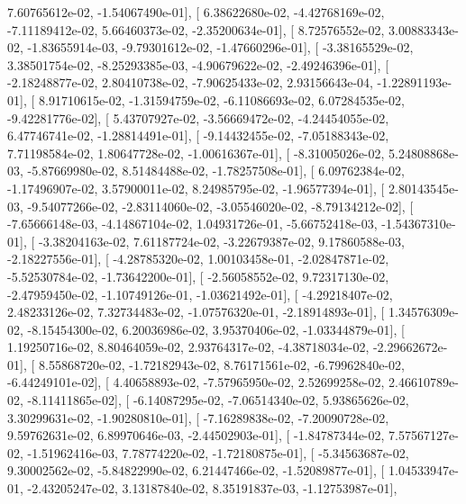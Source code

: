 \documentclass{article}
\begin{document}
          7.60765612e-02,  -1.54067490e-01],
       [  6.38622680e-02,  -4.42768169e-02,  -7.11189412e-02,
          5.66460373e-02,  -2.35200634e-01],
       [  8.72576552e-02,   3.00883343e-02,  -1.83655914e-03,
         -9.79301612e-02,  -1.47660296e-01],
       [ -3.38165529e-02,   3.38501754e-02,  -8.25293385e-03,
         -4.90679622e-02,  -2.49246396e-01],
       [ -2.18248877e-02,   2.80410738e-02,  -7.90625433e-02,
          2.93156643e-04,  -1.22891193e-01],
       [  8.91710615e-02,  -1.31594759e-02,  -6.11086693e-02,
          6.07284535e-02,  -9.42281776e-02],
       [  5.43707927e-02,  -3.56669472e-02,  -4.24454055e-02,
          6.47746741e-02,  -1.28814491e-01],
       [ -9.14432455e-02,  -7.05188343e-02,   7.71198584e-02,
          1.80647728e-02,  -1.00616367e-01],
       [ -8.31005026e-02,   5.24808868e-03,  -5.87669980e-02,
          8.51484488e-02,  -1.78257508e-01],
       [  6.09762384e-02,  -1.17496907e-02,   3.57900011e-02,
          8.24985795e-02,  -1.96577394e-01],
       [  2.80143545e-03,  -9.54077266e-02,  -2.83114060e-02,
         -3.05546020e-02,  -8.79134212e-02],
       [ -7.65666148e-03,  -4.14867104e-02,   1.04931726e-01,
         -5.66752418e-03,  -1.54367310e-01],
       [ -3.38204163e-02,   7.61187724e-02,  -3.22679387e-02,
          9.17860588e-03,  -2.18227556e-01],
       [ -4.28785320e-02,   1.00103458e-01,  -2.02847871e-02,
         -5.52530784e-02,  -1.73642200e-01],
       [ -2.56058552e-02,   9.72317130e-02,  -2.47959450e-02,
         -1.10749126e-01,  -1.03621492e-01],
       [ -4.29218407e-02,   2.48233126e-02,   7.32734483e-02,
         -1.07576320e-01,  -2.18914893e-01],
       [  1.34576309e-02,  -8.15454300e-02,   6.20036986e-02,
          3.95370406e-02,  -1.03344879e-01],
       [  1.19250716e-02,   8.80464059e-02,   2.93764317e-02,
         -4.38718034e-02,  -2.29662672e-01],
       [  8.55868720e-02,  -1.72182943e-02,   8.76171561e-02,
         -6.79962840e-02,  -6.44249101e-02],
       [  4.40658893e-02,  -7.57965950e-02,   2.52699258e-02,
          2.46610789e-02,  -8.11411865e-02],
       [ -6.14087295e-02,  -7.06514340e-02,   5.93865626e-02,
          3.30299631e-02,  -1.90280810e-01],
       [ -7.16289838e-02,  -7.20090728e-02,   9.59762631e-02,
          6.89970646e-03,  -2.44502903e-01],
       [ -1.84787344e-02,   7.57567127e-02,  -1.51962416e-03,
          7.78774220e-02,  -1.72180875e-01],
       [ -5.34563687e-02,   9.30002562e-02,  -5.84822990e-02,
          6.21447466e-02,  -1.52089877e-01],
       [  1.04533947e-01,  -2.43205247e-02,   3.13187840e-02,
          8.35191837e-03,  -1.12753987e-01],
\end{document}
